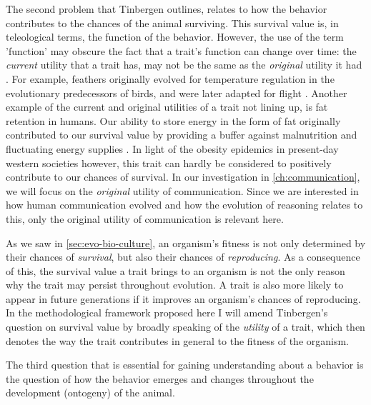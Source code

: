 The second problem that Tinbergen outlines, relates to how the behavior contributes to the chances of the animal surviving.
This survival value is, in teleological terms, the function of the behavior.  However, the use of the term 'function' may obscure the fact that a trait's function can change over time: the \emph{current} utility that a trait has, may not be the same as the \emph{original} utility it had \citep{BatesonLaland13}. For example, feathers originally evolved for temperature regulation in the evolutionary predecessors of birds, and were later adapted for flight \citep{Benton19, BatesonLaland13}.
Another example of the current and original utilities of a trait not lining up, is fat retention in humans. Our ability to store energy in the form of fat originally contributed to our survival value by providing a buffer against malnutrition and fluctuating energy supplies \citep{Wells06}. In light of the obesity epidemics in present-day western societies however, this trait can hardly be considered to positively contribute to our chances of survival.
In our investigation in \cref{ch:communication}, we will focus on the \emph{original} utility of communication. Since we are interested in how human communication evolved and how the evolution of reasoning relates to this, only the original utility of communication is relevant here.

As we saw in \cref{sec:evo-bio-culture}, an organism's fitness is not only determined by their chances of \emph{survival}, but also their chances of \emph{reproducing}. As a consequence of this, the survival value a trait brings to an organism is not the only reason why the trait may persist throughout evolution. A trait is also more likely to appear in future generations if it improves an organism's chances of reproducing. In the methodological framework proposed here I will amend Tinbergen's question on survival value by broadly speaking of the \emph{utility} of a trait, which then denotes the way the trait contributes in general to the fitness of the organism.

The third question that is essential for gaining understanding about a behavior is the question of how the behavior emerges and changes throughout the development (ontogeny) of the animal. 

